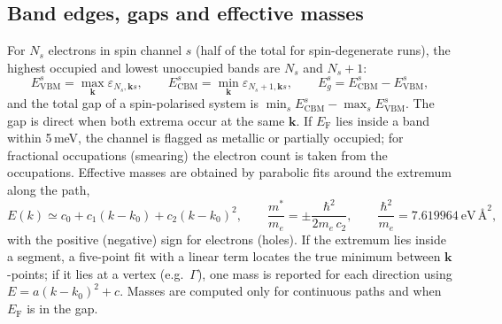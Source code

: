\documentclass[11pt,a4paper]{article}
\newcommand{\eF}{E_\mathrm{F}}
\begin{document}
\subsection{Band edges, gaps and effective masses}
For $N_s$ electrons in spin channel $s$ (half of the total for spin-degenerate runs), the highest occupied and lowest unoccupied bands are $N_s$ and $N_s+1$:
\begin{equation}
E_\mathrm{VBM}^{s}=\max_{\bm{k}}\varepsilon_{N_s,\bm{k} s},\qquad E_\mathrm{CBM}^{s}=\min_{\bm{k}}\varepsilon_{N_s+1,\bm{k} s},\qquad E_g^{s}=E_\mathrm{CBM}^{s}-E_\mathrm{VBM}^{s},
\end{equation}
and the total gap of a spin-polarised system is $\min_s E_\mathrm{CBM}^{s}-\max_s E_\mathrm{VBM}^{s}$. The gap is direct when both extrema occur at the same $\bm{k}$. If $\eF$ lies inside a band within 5\,meV, the channel is flagged as metallic or partially occupied; for fractional occupations (smearing) the electron count is taken from the occupations. Effective masses are obtained by parabolic fits around the extremum along the path,
\begin{equation}
E(k)\simeq c_0+c_1(k-k_0)+c_2(k-k_0)^2,\qquad \frac{m^*}{m_e}=\pm\frac{\hbar^2}{2m_e\,c_2},\qquad \frac{\hbar^2}{m_e}=7.619964\ \mathrm{eV\,\text{\AA}^2},
\end{equation}
with the positive (negative) sign for electrons (holes). If the extremum lies inside a segment, a five-point fit with a linear term locates the true minimum between $\bm{k}$-points; if it lies at a vertex (e.g.\ $\Gamma$), one mass is reported for each direction using $E=a(k-k_0)^2+c$. Masses are computed only for continuous paths and when $\eF$ is in the gap.
\end{document}
